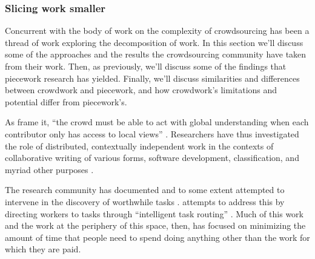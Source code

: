 \documentclass[trackingWork]{subfiles}
\begin{document}
\subsubsection{Slicing work smaller
}\label{sec:Slicing}

Concurrent with the body of work on the complexity of crowdsourcing
has been a thread of work exploring the decomposition of work.
In this section we'll discuss some of the approaches and the results 
the crowdsourcing community have taken from their work.
Then, as previously,
we'll discuss some of the findings that piecework research
has yielded.
Finally, we'll discuss similarities and differences between crowdwork and piecework,
and how crowdwork's limitations and potential differ from piecework's.

As \citeauthor{verroios2014context} frame it,
``the crowd must be able to act with
global understanding when each contributor only has access to local views''
\cite{verroios2014context}.
Researchers have thus investigated the role of
distributed, contextually independent work
in the contexts of collaborative writing of various forms,
software development,
classification, and myriad other purposes
\cite{Kittur:2009:CCI:1518701.1518928,Baecker:1993:UID:169059.169312,
      10.2307/1562247,karnin2010crowdsourcing,bragg2013crowdsourcing,
      chilton2013cascade}.



The research community has documented and to some extent attempted to intervene in
the discovery of worthwhile tasks
\cite{taskSearch}.
\citeauthor{Cosley:2007:SUI:1216295.1216309}
attempts to address this by
directing workers to tasks through
``intelligent task routing''
\cite{Cosley:2007:SUI:1216295.1216309}.
Much of this work and the work at the periphery of this space, then,
has focused on
minimizing the amount of time that people need to spend doing
anything other than the work for which they are paid.
\end{document}
